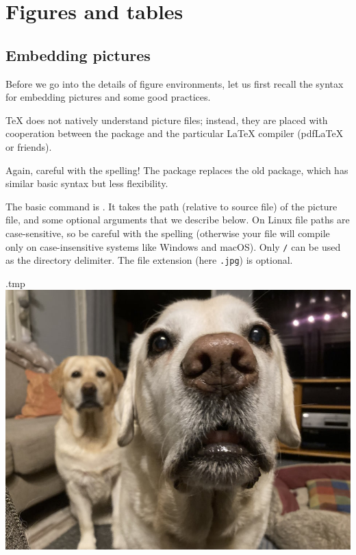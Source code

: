 \chapter{Figures and tables}


%
%
%
\section{Embedding pictures}\label{sec:pictures}

Before we go into the details of figure environments,
let us first recall the syntax for embedding pictures
and some good practices.

\TeX{} does not natively understand picture files;
instead, they are placed with cooperation between the  package
and the particular \LaTeX{} compiler (pdfLaTeX or friends).

\begin{warning}
Again, careful with the spelling!
The  package replaces the old  package,
which has similar basic syntax but less flexibility.
\end{warning}

The basic command is .
It takes the path (relative to source file) of the picture file,
and some optional arguments that we describe below.
On Linux file paths are case-sensitive, so be careful with the spelling
(otherwise your file will compile only on case-insensitive systems like Windows and macOS).
Only \verb|/| can be used as the directory delimiter.
The file extension (here \verb|.jpg|) is optional.

\begin{VerbatimOut}{\jobname.tmp}
\includegraphics[width=\textwidth]
    {pictures/TheDogs.jpg}
\end{VerbatimOut}
\ShowExample

